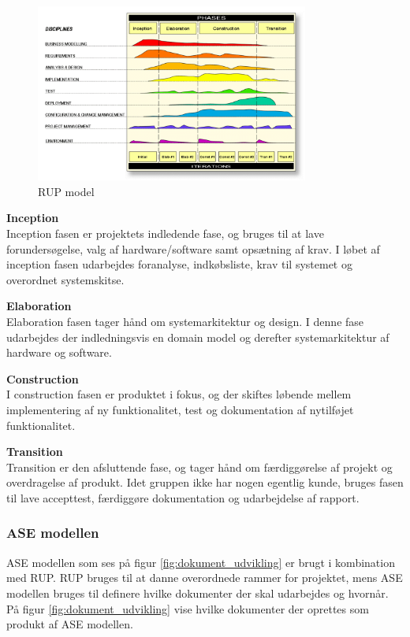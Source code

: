 \begin{figure}[H]
	\centering
	\includegraphics[width=0.80\textwidth]{Billeder/Udviklingsproces/RUP}
	\caption{RUP model}
	\label{fig:rup}
\end{figure}

\textbf{Inception}\\
Inception fasen er projektets indledende fase, og bruges til at lave forundersøgelse, valg af hardware/software samt opsætning af krav. I løbet af inception fasen udarbejdes foranalyse, indkøbsliste, krav til systemet og overordnet systemskitse. 

\textbf{Elaboration}\\
Elaboration fasen tager hånd om systemarkitektur og design. I denne fase udarbejdes der indledningsvis en domain model og derefter systemarkitektur af hardware og software. 

\textbf{Construction}\\
I construction fasen er produktet i fokus, og der skiftes løbende mellem implementering af ny funktionalitet, test og dokumentation af nytilføjet funktionalitet. 

\textbf{Transition}\\
Transition er den afsluttende fase, og tager hånd om færdiggørelse af projekt og overdragelse af produkt. Idet gruppen ikke har nogen egentlig kunde, bruges fasen til lave accepttest, færdiggøre dokumentation og udarbejdelse af rapport. 

\newpage

\subsubsection*{ASE modellen}
ASE modellen som ses på figur \ref{fig:dokument_udvikling} er brugt i kombination med RUP. RUP bruges til at danne overordnede rammer for projektet, mens ASE modellen bruges til definere hvilke dokumenter der skal udarbejdes og hvornår. På figur \ref{fig:dokument_udvikling} vise hvilke dokumenter der oprettes som produkt af ASE modellen. 

